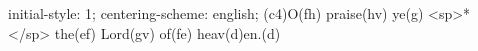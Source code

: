 initial-style: 1;
centering-scheme: english;
(c4)O(fh) praise(hv) ye(g) <sp>*</sp> the(ef) Lord(gv) of(fe) heav(d)en.(d)